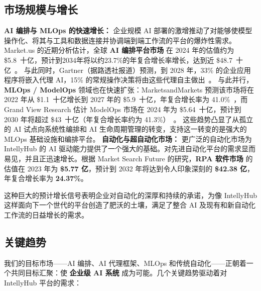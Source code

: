 \documentclass[11pt, a4paper, oneside]{article}
\begin{document}
\subsection{市场规模与增长}
\textbf{AI 编排与 MLOps 的快速增长：} 企业规模 AI 部署的激增推动了对能够使模型操作化、将其与工具和数据连接并协调端到端工作流的平台的爆炸性需求。  
Market.us 的近期分析估计，全球 \textbf{AI 编排平台市场} 在 2024 年的估值约为 \$5.8~十亿，预计到2034年将以约23.7\%的年复合增长率增长，达到近 \$48.7~十亿~\cite{AIOrch}。  
与此同时，Gartner（据路透社报道）预测，到 2028 年，33\% 的企业应用程序将嵌入代理 AI，15\% 的常规操作决策将由这些代理自主做出~\cite{GartnerAgentic}。  
与此并行，\textbf{MLOps / ModelOps} 领域也在快速扩张：MarketsandMarkets 预测该市场将在 2022 年从 \$1.1~十亿增长到 2027 年的 \$5.9~十亿，年复合增长率为 41.0\%~\cite{MLOpsMM}，而 Grand View Research 估计 ModelOps 市场在 2024 年为 \$5.64~十亿，预计到 2030 年将超过 \$43~十亿（年复合增长率约为 41.3\%）~\cite{ModelOpsGV}。  
这些趋势凸显了从孤立的 AI 试点向系统性编排和 AI 生命周期管理的转变，支持这一转变的是强大的 MLOps 基础设施和编排平台。
\newline\newline
\textbf{自动化与超自动化市场：} 更广泛的自动化市场为 IntellyHub 的 AI 驱动能力提供了一个强大的基础。对先进自动化平台的需求显而易见，并且正迅速增长。根据 Market Search Future 的研究，\textbf{RPA 软件市场} 的估值在 2023 年为 \textbf{\$5.77 亿}，预计到 2032 年将达到令人印象深刻的 \textbf{\$42.38 亿}，年复合增长率为 \textbf{24.37\%}\cite{mrfRPA}。

这种巨大的预计增长信号表明企业对自动化的深厚和持续的承诺，为像 IntellyHub 这样面向下一个世代的平台创造了肥沃的土壤，满足了整合 AI 及现有和新自动化工作流的日益增长的需求。

\subsection{关键趋势}
我们的目标市场——AI 编排、AI 代理框架、MLOps 和传统自动化——正朝着一个共同目标汇聚：使 \textbf{企业级 AI 系统} 成为可能。几个关键趋势驱动着对 IntellyHub 平台的需求：
\end{document}
